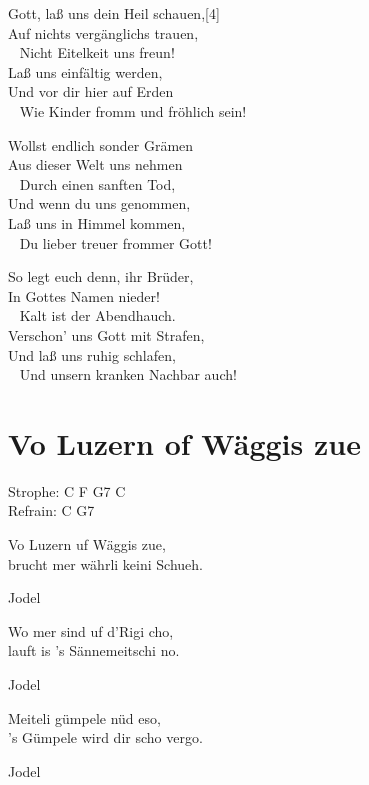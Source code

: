 \documentclass[
  letterpaper,
]{scrbook}
\begin{document}
Gott, laß uns dein Heil schauen,{[}4{]}\\
Auf nichts vergänglichs trauen,\\
\hspace*{0.333em} ~ Nicht Eitelkeit uns freun!\\
Laß uns einfältig werden,\\
Und vor dir hier auf Erden\\
\hspace*{0.333em} ~ Wie Kinder fromm und fröhlich sein!

Wollst endlich sonder Grämen\\
Aus dieser Welt uns nehmen\\
\hspace*{0.333em} ~ Durch einen sanften Tod,\\
Und wenn du uns genommen,\\
Laß uns in Himmel kommen,\\
\hspace*{0.333em} ~ Du lieber treuer frommer Gott!

So legt euch denn, ihr Brüder,\\
In Gottes Namen nieder!\\
\hspace*{0.333em} ~ Kalt ist der Abendhauch.\\
Verschon' uns Gott mit Strafen,\\
Und laß uns ruhig schlafen,\\
\hspace*{0.333em} ~ Und unsern kranken Nachbar auch!

\hypertarget{vo-luzern-of-wuxe4ggis-zue}{%
\chapter{Vo Luzern of Wäggis zue}\label{vo-luzern-of-wuxe4ggis-zue}}

Strophe: C F G7 C\\
Refrain: C G7

Vo Luzern uf Wäggis zue,\\
brucht mer währli keini Schueh.

Jodel

Wo mer sind uf d'Rigi cho,\\
lauft is 's Sännemeitschi no.

Jodel

Meiteli gümpele nüd eso,\\
's Gümpele wird dir scho vergo.

Jodel
\end{document}
